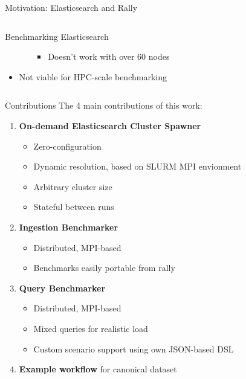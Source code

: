 \documentclass[compress,aspectratio=169]{beamer}
\begin{document}
\begin{frame}{Motivation: Elasticsearch and Rally}
\begin{columns}
\begin{column}{0.5\textwidth}
\begin{block}{Benchmarking Elasticsearch}
\begin{itemize}
\begin{itemize}
                  \begin{itemize}
                    \item Doesn't work with over 60 nodes
                  \end{itemize}
              \end{itemize}
              \item Not viable for HPC-scale benchmarking
          \end{itemize}
        \end{block}
      \end{column}
    \end{columns}
  \end{frame}
  
  \begin{frame}{Contributions}
    The 4 main contributions of this work:
    \pause
    \begin{enumerate}
      \item \textbf{On-demand Elasticsearch Cluster Spawner}
        \begin{itemize}
          \item Zero-configuration
          \item Dynamic resolution, based on SLURM MPI envionment
          \item Arbitrary cluster size
          \item Stateful between runs
        \end{itemize}
        \pause
      \item \textbf{Ingestion Benchmarker}
        \begin{itemize}
          \item Distributed, MPI-based
          \item Benchmarks easily portable from rally
        \end{itemize}
        \pause
      \item \textbf{Query Benchmarker}
        \begin{itemize}
          \item Distributed, MPI-based
          \item Mixed queries for realistic load
          \item Custom scenario support using own JSON-based DSL
        \end{itemize}
        \pause
      \item \textbf{Example workflow} for canonical dataset
    \end{enumerate}
  \end{frame}
\end{document}
